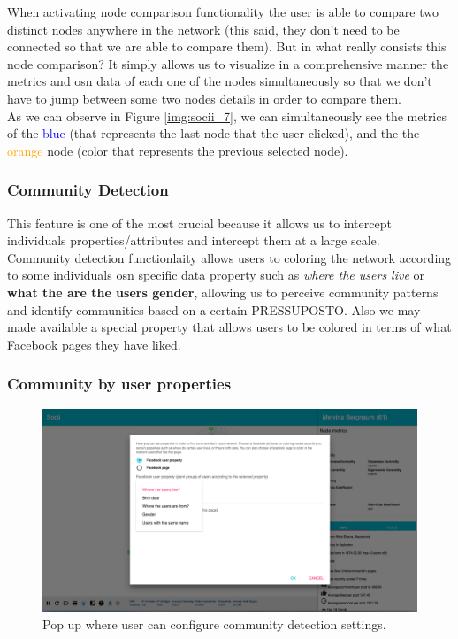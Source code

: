 When activating node comparison functionality the user is able to compare two distinct nodes anywhere in the network (this said, they don't need to be connected so that we are able to compare them). But in what really consists this node comparison? It simply allows us to visualize in a comprehensive manner the metrics and \gls{osn} data of each one of the nodes simultaneously so that we don't have to jump between some two nodes details in order to compare them.\\
\indent As we can observe in Figure \ref{img:socii_7}, we can simultaneously see the metrics of the \textcolor{blue}{blue} (that represents the last node that the user clicked), and the the \textcolor{orange}{orange} node (color that represents the previous selected node).

\subsubsection{Community Detection}

This feature is one of the most crucial because it allows us to intercept individuals properties/attributes and intercept them at a large scale.\\
\indent Community detection functionlaity allows users to coloring the network according to some individuals \gls{osn} specific data property such as \textit{where the users live} or \textbf{what the are the users gender}, allowing us to perceive community patterns and identify communities based on a certain PRESSUPOSTO. Also we may made available a special property that allows users to be colored in terms of what Facebook pages they have liked.

\subsubsection*{Community by user properties}

\begin{figure}[h!]
\begin{center}
  \hspace*{-0.8in}
  \includegraphics[width=1.2\textwidth]{img/socii/socii_8.png}
\end{center}
\caption{\label{img:socii_8} Pop up where user can configure community detection settings.}
\end{figure}


